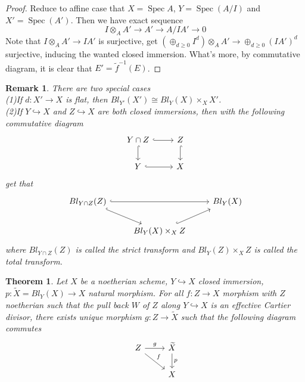 \documentclass{ctexart}
\newtheorem{remark}{Remark}[section]
\newtheorem{theorem}{Theorem}[section]
\newcommand{\spec}{\operatorname{Spec}}
\begin{document}
\begin{proof}
    Reduce to affine case that $X = \spec A$, $Y = \spec(A/I)$ and $X' = \spec(A')$.
    Then we have exact sequence
    \begin{equation*}
        I \otimes_{A} A' \longrightarrow A' \longrightarrow A/IA' \longrightarrow 0
    \end{equation*}
    Note that $I \otimes_{A} A' \longrightarrow IA'$ is surjective, get $(\oplus_{d \ge 0} I^{d}) \otimes_{A} A' \longrightarrow \oplus_{d \ge 0} (IA')^{d}$ surjective, inducing the wanted closed immersion.
    What's more, by commutative diagram, it is clear that $E' = \widetilde{f}^{-1}(E)$.
\end{proof}
\begin{remark}
    There are two special cases \\
    (1)If $d: X' \longrightarrow X$ is flat, then $Bl_{Y'}(X') \cong Bl_{Y}(X) \times_{X} X'$. \\
    (2)If $Y \hookrightarrow X$ and $Z \hookrightarrow X$ are both closed immersions,
    then with the following commutative diagram 
    \begin{equation*}
        \begin{tikzcd}
            Y \cap Z \arrow[r, hookrightarrow] \arrow[d, hookrightarrow] &
            Z \arrow[d, hookrightarrow] \\
            Y \arrow[r, hookrightarrow] &
            X 
        \end{tikzcd}
    \end{equation*}
    get that
    \begin{equation*}
        \begin{tikzcd}
            Bl_{Y \cap Z}(Z) \arrow[rr, hookrightarrow] \arrow[dr, hookrightarrow] &&
            Bl_{Y}(X) \\
            & Bl_{Y}(X) \times_{X} Z \arrow[ur, hookrightarrow] &
        \end{tikzcd}
    \end{equation*}
    where $Bl_{Y \cap Z}(Z)$ is called the strict transform and $Bl_{Y}(Z) \times_{X} Z$ is called the total transform.
\end{remark}
\begin{theorem}
    Let $X$ be a noetherian scheme, $Y \hookrightarrow X$ closed immersion, $p: \tilde{X} = Bl_{Y}(X) \longrightarrow X$ natural morphism.
    For all $f: Z \longrightarrow X$ morphism with $Z$ noetherian such that the pull back $W$ of $Z$ along $Y \hookrightarrow X$ is an effective Cartier divisor,
    there exists unique morphism $g: Z \longrightarrow \widetilde{X}$ such that the following diagram commutes
    \begin{equation*}
        \begin{tikzcd}
            Z \arrow[r, "g"] \arrow[dr, "f"] &
            \widetilde{X} \arrow[d, "p"] \\
            & X
        \end{tikzcd}
    \end{equation*}
    \label{Theorem 10.1}
\end{theorem}
\end{document}
